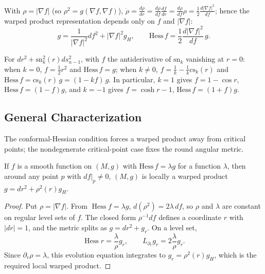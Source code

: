 \begin{remark}
  \label{rem:pet-ch4-warped-product-canonical-form}
  With $\rho=|\nabla f|$ (so $\rho^2=g(\nabla f,\nabla f)$),
  $\dot\rho=\tfrac{d\rho}{dr}=\tfrac{d\rho}{df}\tfrac{df}{dr}=\tfrac{d\rho}{df}\rho
  =\tfrac12\tfrac{d|\nabla f|^2}{df}$; hence the warped product representation
  depends only on $f$ and $|\nabla f|$:
  \[
    g=\frac1{|\nabla f|^2}df^2+|\nabla f|^2g_H,\qquad
    \mathrm{Hess}\,f=\frac12\frac{d|\nabla f|^2}{df}\,g.
  \]
\end{remark}

\begin{example}
  \label{ex:pet-ch4-hess-f-space-forms}
  For $dr^2+\mathrm{sn}_k^2(r)ds_{n-1}^2$, with $f$ the antiderivative of
  $\mathrm{sn}_k$ vanishing at $r=0$: when $k=0$, $f=\tfrac12r^2$ and
  $\mathrm{Hess}\,f=g$; when $k\ne0$, $f=\tfrac1k-\tfrac1k\mathrm{cs}_k(r)$ and
  $\mathrm{Hess}\,f=\mathrm{cs}_k(r)\,g=(1-kf)\,g$. In particular, $k=1$ gives
  $f=1-\cos r$, $\mathrm{Hess}\,f=(1-f)g$, and $k=-1$ gives $f=\cosh r-1$,
  $\mathrm{Hess}\,f=(1+f)g$.
\end{example}

\subsection{General Characterization}

The conformal-Hessian condition forces a warped product away from critical points;
the nondegenerate critical-point case fixes the round angular metric.

\begin{theorem}
  \label{thm:pet-ch4-brinkmann-warped-product}
  If $f$ is a smooth function on $(M,g)$ with $\mathrm{Hess}\,f=\lambda g$ for a
  function $\lambda$, then around any point $p$ with $df|_p\ne0$, $(M,g)$ is
  locally a warped product $g=dr^2+\rho^2(r)g_H$.
\end{theorem}
\begin{proof}
  \sketch
  Put $\rho=|\nabla f|$. From $\operatorname{Hess}f=\lambda g$,
  $d(\rho^2)=2\lambda\,df$, so $\rho$ and $\lambda$ are constant on regular
  level sets of $f$. The closed form $\rho^{-1}df$ defines a coordinate $r$
  with $|dr|=1$, and the metric splits as $g=dr^2+g_r$. On a level set,
  \[
    \operatorname{Hess}r=\frac{\lambda}{\rho}g_r,
    \qquad L_{\partial_r}g_r=2\frac{\lambda}{\rho}g_r.
  \]
  Since $\partial_r\rho=\lambda$, this evolution equation integrates to
  $g_r=\rho^2(r)g_H$, which is the required local warped product.
\end{proof}


